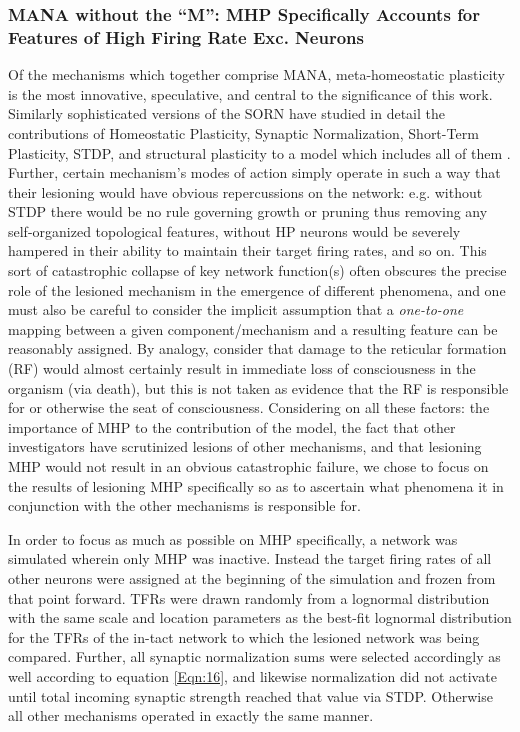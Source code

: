 \documentclass[10pt,letterpaper]{article}
\begin{document}
\subsubsection*{MANA without the ``M'': MHP Specifically Accounts for Features of High Firing Rate Exc. Neurons}
\label{SubSec.MHP_FR_wire}

Of the mechanisms which together comprise MANA, meta-homeostatic plasticity is the most innovative, speculative, and central to the significance of this work. Similarly sophisticated versions of the SORN have studied in detail the contributions of Homeostatic Plasticity, Synaptic Normalization, Short-Term Plasticity,  STDP, and structural plasticity to a model which includes all of them \cite{miner2016plasticity}. Further, certain mechanism's modes of action simply operate in such a way that their lesioning would have obvious repercussions on the network: e.g. without STDP there would be no rule governing growth or pruning thus removing any self-organized topological features, without HP neurons would be severely hampered in their ability to maintain their target firing rates, and so on. This sort of catastrophic collapse of key network function(s) often obscures the precise role of the lesioned mechanism in the emergence of different phenomena, and one must also be careful to consider the implicit assumption that a \emph{one-to-one} mapping between a given component/mechanism and a resulting feature can be reasonably assigned. By analogy, consider that damage to the reticular formation (RF) would almost certainly result in immediate loss of consciousness in the organism (via death), but this is not taken as evidence that the RF is responsible for or otherwise the seat of consciousness. Considering on all these factors: the importance of MHP to the contribution of the model, the fact that other investigators have scrutinized lesions of other mechanisms, and that lesioning MHP would not result in an obvious catastrophic failure, we chose to focus on the results of lesioning MHP specifically so as to ascertain what phenomena it in conjunction with the other mechanisms is responsible for.

In order to focus as much as possible on MHP specifically, a network was simulated wherein only MHP was inactive. Instead the target firing rates of all other neurons were assigned at the beginning of the simulation and frozen from that point forward. TFRs were drawn randomly from a lognormal distribution with the same scale and location parameters as the best-fit lognormal distribution for the TFRs of the in-tact network to which the lesioned network was being compared. Further, all synaptic normalization sums were selected accordingly as well according to equation \ref{Eqn:16}, and likewise normalization did not activate until total incoming synaptic strength reached that value via STDP. Otherwise all other mechanisms operated in exactly the same manner. 
\end{document}
